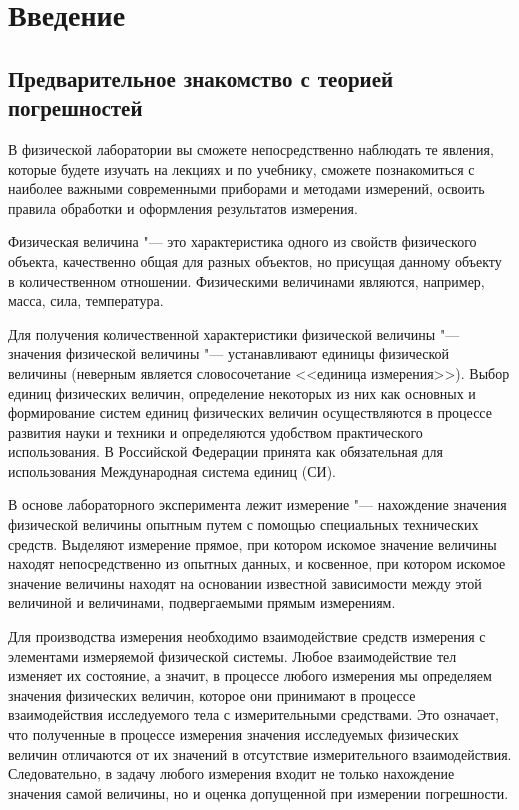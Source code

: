 \documentclass[a4paper, 12pt]{extarticle}
\begin{document}
\newpage

\setcounter{section}{-1} %
\section*{Введение}
\subsection{Предварительное знакомство с теорией погрешностей}
В физической лаборатории вы сможете непосредственно наблюдать те явления, которые будете изучать на лекциях и по учебнику, сможете познакомиться с наиболее важными современными приборами и методами измерений, освоить правила обработки и оформления результатов измерения.

 Физическая величина "---  это характеристика одного из свойств физического объекта, качественно общая для разных объектов, но присущая данному объекту в количественном отношении. Физическими величинами являются, например, масса, сила, температура.

  Для получения количественной характеристики физической величины "---  значения физической величины "---  устанавливают единицы физической величины (неверным является словосочетание <<единица измерения>>). Выбор единиц физических величин, определение некоторых из них как основных и формирование систем единиц физических величин осуществляются в процессе развития науки и техники и определяются удобством практического использования. В Российской Федерации принята как обязательная для использования Международная система единиц (СИ).


  В основе лабораторного эксперимента лежит измерение "---  нахождение значения физической величины опытным путем с помощью специальных технических средств. Выделяют измерение прямое, при котором искомое значение величины находят непосредственно из опытных данных, и косвенное, при котором искомое значение величины находят на основании известной зависимости между этой величиной и величинами, подвергаемыми прямым измерениям.



Для производства измерения необходимо взаимодействие средств измерения с элементами измеряемой физической системы. Любое взаимодействие тел изменяет их состояние, а значит, в процессе любого измерения мы определяем значения физических величин, которое они принимают в процессе взаимодействия исследуемого тела с измерительными средствами. Это означает, что полученные в процессе измерения значения исследуемых физических величин отличаются от их значений в отсутствие измерительного взаимодействия. Следовательно, в задачу любого измерения входит не только нахождение значения самой величины, но и оценка допущенной при измерении погрешности.
\end{document}
